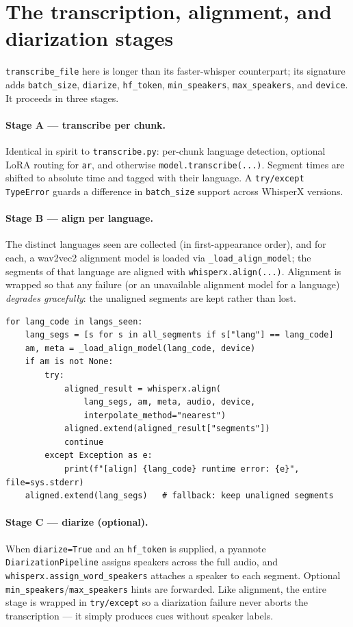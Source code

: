 \documentclass[11pt,a4paper]{report}
\newcommand{\code}[1]{\texttt{\small #1}}
\begin{document}
\section{The transcription, alignment, and diarization stages}

\code{transcribe\_file} here is longer than its faster-whisper counterpart; its
signature adds \code{batch\_size}, \code{diarize}, \code{hf\_token},
\code{min\_speakers}, \code{max\_speakers}, and \code{device}. It proceeds in
three stages.

\paragraph{Stage A --- transcribe per chunk.} Identical in spirit to
\texttt{transcribe.py}: per-chunk language detection, optional LoRA routing for
\code{ar}, and otherwise \code{model.transcribe(...)}. Segment times are shifted
to absolute time and tagged with their language. A \code{try/except TypeError}
guards a difference in \code{batch\_size} support across WhisperX versions.

\paragraph{Stage B --- align per language.} The distinct languages seen are
collected (in first-appearance order), and for each, a wav2vec2 alignment model is
loaded via \code{\_load\_align\_model}; the segments of that language are aligned
with \code{whisperx.align(...)}. Alignment is wrapped so that any failure (or an
unavailable alignment model for a language) \emph{degrades gracefully}: the
unaligned segments are kept rather than lost.

\begin{lstlisting}[caption={Per-language alignment with graceful fallback (abridged).}]
for lang_code in langs_seen:
    lang_segs = [s for s in all_segments if s["lang"] == lang_code]
    am, meta = _load_align_model(lang_code, device)
    if am is not None:
        try:
            aligned_result = whisperx.align(
                lang_segs, am, meta, audio, device,
                interpolate_method="nearest")
            aligned.extend(aligned_result["segments"])
            continue
        except Exception as e:
            print(f"[align] {lang_code} runtime error: {e}", file=sys.stderr)
    aligned.extend(lang_segs)   # fallback: keep unaligned segments
\end{lstlisting}

\paragraph{Stage C --- diarize (optional).} When \code{diarize=True} and an
\code{hf\_token} is supplied, a pyannote \code{DiarizationPipeline} assigns
speakers across the full audio, and \code{whisperx.assign\_word\_speakers} attaches
a speaker to each segment. Optional \code{min\_speakers}/\code{max\_speakers} hints
are forwarded. Like alignment, the entire stage is wrapped in \code{try/except} so
a diarization failure never aborts the transcription --- it simply produces cues
without speaker labels.
\end{document}
